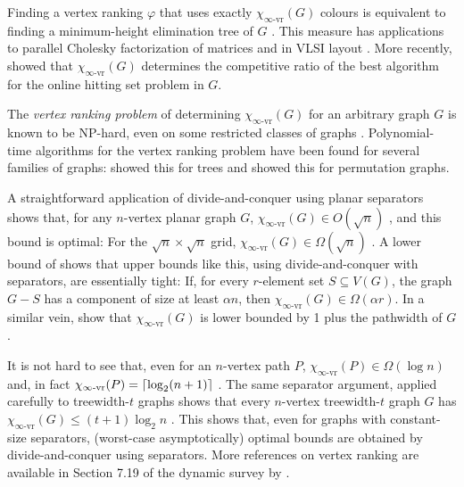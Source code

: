 \documentclass[kpfonts]{patmorin}
\newcommand{\defin}[1]{\emph{\color{brightmaroon}#1}}
\newcommand{\rn}[1]{\chi_{\operatorname{#1-vr}}}
\newcommand{\irn}{\rn{\infty}}
\theoremstyle{named}
\begin{document}
Finding a vertex ranking $\varphi$ that uses exactly $\irn(G)$ colours is equivalent to finding a minimum-height elimination tree of $G$ \cite{torre.greenlaw.ea:optimal,deogun.kloks.ea:on}.  This measure has applications to parallel Cholesky factorization of matrices \cite{bodlaender.gilbert.ea:approximating,duff.reid:multifrontal,liu:role,dereniowski.kubale:cholesky} and in VLSI layout \cite{leiserson:area,sen.deng.ea:on}.  More recently, \citet{even.smorodinsky:hitting} showed that $\irn(G)$ determines the competitive ratio of the best algorithm for the online hitting set problem in $G$.

The \defin{vertex ranking problem} of determining $\irn(G)$ for an arbitrary graph $G$ is known to be NP-hard, even on some restricted classes of graphs \cite{bodlaender.deogun.ea:rankings,llewellyn.tovey.ea:local,llewellyn.tovey.ea:erratum,dereniowski.nadolski:vertex}. Polynomial-time algorithms for the vertex ranking problem have been found for several families of graphs: \citet{schaeffer:optimal,iyer.ratliff.ea:optimal} showed this for trees and \citet{deogun.kloks.ea:on} showed this for permutation graphs.

A straightforward application of divide-and-conquer using planar separators shows that, for any $n$-vertex planar graph $G$, $\irn(G) \in O(\sqrt{n})$ \cite{llewellyn.tovey.ea:local,katchalski.mccuaig.ea:ordered}, and this bound is optimal:  For the $\sqrt{n}\times\sqrt{n}$ grid, $\irn(G)\in \Omega(\sqrt{n})$ \cite{katchalski.mccuaig.ea:ordered}.  A lower bound of \citet{katchalski.mccuaig.ea:ordered} shows that upper bounds like this, using divide-and-conquer with separators, are essentially tight: If, for every $r$-element set $S\subseteq V(G)$, the graph $G-S$ has a component of size at least $\alpha n$, then $\irn(G) \in\Omega(\alpha r)$. In a similar vein, \citet{bodlaender.gilbert.ea:approximating,kloks:treewidth} show that $\irn(G)$ is lower bounded by 1 plus the pathwidth of $G$.

It is not hard to see that, even for an $n$-vertex path $P$, $\irn(P)\in\Omega(\log n)$ and, in fact $\irn(P)=\ceil{\log_2(n+1)}$ \cite{nesetril.ossona:tree-depth}.  The same separator argument, applied carefully to treewidth-$t$ graphs shows that every $n$-vertex treewidth-$t$ graph $G$ has $\irn(G)\le (t+1)\log_2 n$ \cite{nesetril.ossona:tree-depth}.  This shows that, even for graphs with constant-size separators, (worst-case asymptotically) optimal bounds are obtained by divide-and-conquer using separators.  More references on vertex ranking are available in Section 7.19 of the dynamic survey by \citet{gallian:dynamic}.
\end{document}
